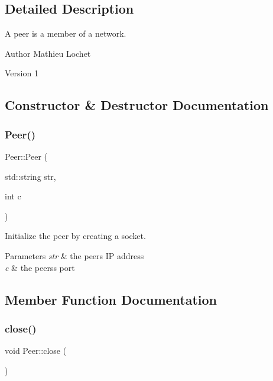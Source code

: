 \subsection{Detailed Description}
A peer is a member of a network.

\begin{DoxyAuthor}{Author}
Mathieu Lochet 
\end{DoxyAuthor}
\begin{DoxyVersion}{Version}
1 
\end{DoxyVersion}


\subsection{Constructor \& Destructor Documentation}
\mbox{\label{classPeer_a818beac4dac9c4a1d9ebffcfaed2e98f}} 
\subsubsection{\texorpdfstring{Peer()}{Peer()}}
{\footnotesize\ttfamily Peer\+::\+Peer (\begin{DoxyParamCaption}\item[{std\+::string}]{str,  }\item[{int}]{c }\end{DoxyParamCaption})}

Initialize the peer by creating a socket.


\begin{DoxyParams}{Parameters}
{\em str} & the peer\textquotesingle{}s IP address \\
\hline
{\em c} & the peers\textquotesingle{}s port \\
\hline
\end{DoxyParams}


\subsection{Member Function Documentation}
\mbox{\label{classPeer_a314984f7fd35ec189f125bea9483881b}} 
\subsubsection{\texorpdfstring{close()}{close()}}
{\footnotesize\ttfamily void Peer\+::close (\begin{DoxyParamCaption}{ }\end{DoxyParamCaption})}

